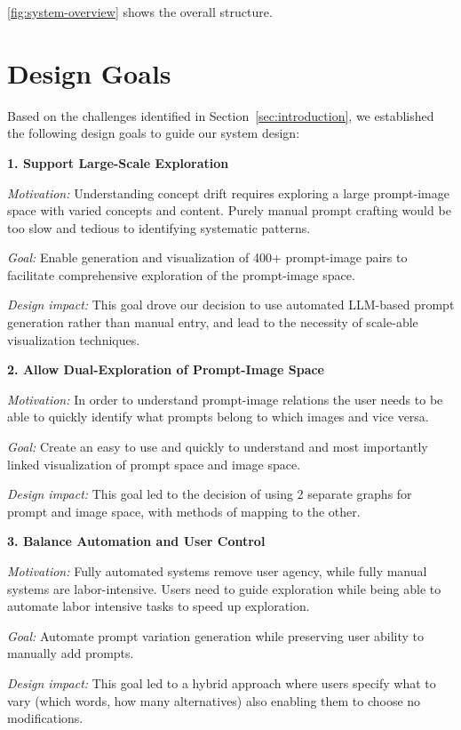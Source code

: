 \documentclass[
  a4paper,  %
  twoside,  %
  bibliography=totoc,
  headsepline,
  cleardoublepage=empty,
  parskip=half,
  draft=false
]{scrbook}
\begin{document}
\ref{fig:system-overview} shows the overall structure.

\section{Design Goals}

Based on the challenges identified in Section~\ref{sec:introduction}, we established the following design goals to guide our system design:

\textbf{1. Support Large-Scale Exploration}

\textit{Motivation:} Understanding concept drift requires exploring a large prompt-image space with varied concepts and content. Purely manual prompt crafting would be too slow and tedious to identifying systematic patterns.

\textit{Goal:} Enable generation and visualization of 400+ prompt-image pairs to facilitate comprehensive exploration of the prompt-image space.

\textit{Design impact:} This goal drove our decision to use automated LLM-based prompt generation rather than manual entry, and lead to the necessity of scale-able visualization techniques.

\textbf{2. Allow Dual-Exploration of Prompt-Image Space}

\textit{Motivation:} In order to understand prompt-image relations the user needs to be able to quickly identify what prompts belong to which images and vice versa.

\textit{Goal:} Create an easy to use and quickly to understand and most importantly linked visualization of prompt space and image space.

\textit{Design impact:} This goal led to the decision of using 2 separate graphs for prompt and image space, with methods of mapping to the other. 


\textbf{3. Balance Automation and User Control}

\textit{Motivation:} Fully automated systems remove user agency, while fully manual systems are labor-intensive. Users need to guide exploration while being able to automate labor intensive tasks to speed up exploration.

\textit{Goal:} Automate prompt variation generation while preserving user ability to manually add prompts.

\textit{Design impact:} This goal led to a hybrid approach where users specify what to vary (which words, how many alternatives) also enabling them to choose no modifications.
\end{document}
